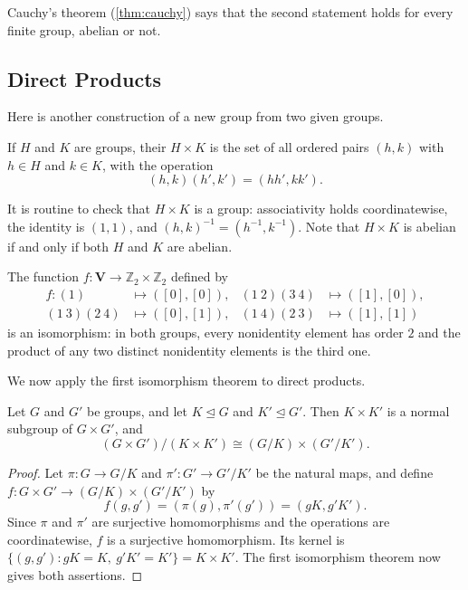 Cauchy's theorem (\autoref{thm:cauchy}) says that the second statement holds for every
finite group, abelian or not.

\subsection{Direct Products}

Here is another construction of a new group from two given groups.

\begin{definition}\label{def:direct-product}
	If \(H\) and \(K\) are groups, their  \(H \times K\) is the set of
	all ordered pairs \((h, k)\) with \(h \in H\) and \(k \in K\), with the operation
	\[
		(h, k)(h', k') = (hh', kk').
	\]
\end{definition}

It is routine to check that \(H \times K\) is a group: associativity holds coordinatewise,
the identity is \((1, 1)\), and \((h, k)^{-1} = (h^{-1}, k^{-1})\). Note that \(H \times K\)
is abelian if and only if both \(H\) and \(K\) are abelian.

\begin{eg}\label{eg:V-Z2Z2}
	The function \(f\colon \mathbf V \to \mathbb Z_2 \times \mathbb Z_2\) defined by
	\begin{align*}
		f\colon (1)          & \mapsto ([0], [0]), & (1\ 2)(3\ 4) & \mapsto ([1], [0]), \\
		(1\ 3)(2\ 4)         & \mapsto ([0], [1]), & (1\ 4)(2\ 3) & \mapsto ([1], [1])
	\end{align*}
	is an isomorphism: in both groups, every nonidentity element has order \(2\) and the
	product of any two distinct nonidentity elements is the third one.
\end{eg}

We now apply the first isomorphism theorem to direct products.

\begin{proposition}\label{prop:product-quotient}
	Let \(G\) and \(G'\) be groups, and let \(K \trianglelefteq G\) and
	\(K' \trianglelefteq G'\). Then \(K \times K'\) is a normal subgroup of \(G \times G'\),
	and
	\[
		(G \times G')/(K \times K') \cong (G/K) \times (G'/K').
	\]
\end{proposition}

\begin{proof}
	Let \(\pi\colon G \to G/K\) and \(\pi'\colon G' \to G'/K'\) be the natural maps, and
	define \(f\colon G \times G' \to (G/K) \times (G'/K')\) by
	\[
		f(g, g') = (\pi(g), \pi'(g')) = (gK, g'K').
	\]
	Since \(\pi\) and \(\pi'\) are surjective homomorphisms and the operations are
	coordinatewise, \(f\) is a surjective homomorphism. Its kernel is
	\(\{(g, g') : gK = K,\ g'K' = K'\} = K \times K'\). The first isomorphism theorem now
	gives both assertions.
\end{proof}

